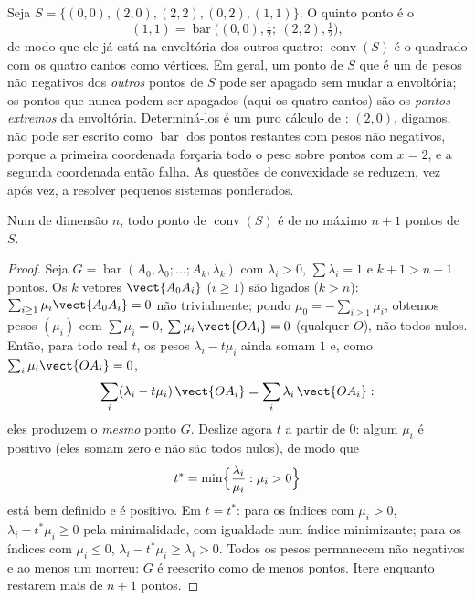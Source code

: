 \begin{example}\label{ex:b2:affine:squarehull}
Seja $S = \{(0,0), (2,0), (2,2), (0,2), (1,1)\}$. O quinto
ponto é o 
\[
(1,1) = \operatorname{bar}\bigl((0,0), \tfrac12;\ (2,2),
\tfrac12\bigr),
\]
de modo que ele já está na envoltória dos outros quatro:
$\operatorname{conv}(S)$ é o quadrado com os quatro cantos
como vértices. Em geral, um ponto de $S$ que é um
 de pesos não negativos dos \emph{outros} pontos de
$S$ pode ser apagado sem mudar a envoltória; os pontos que
nunca podem ser apagados (aqui os quatro cantos) são os
\emph{pontos extremos} da envoltória. Determiná-los é um puro
cálculo de : $(2,0)$, digamos, não pode ser escrito como
$\operatorname{bar}$ dos pontos restantes com pesos não
negativos, porque a primeira coordenada forçaria todo o peso
sobre pontos com $x = 2$, e a segunda coordenada então
falha. As questões de convexidade se reduzem, vez após vez, a
resolver pequenos sistemas ponderados.
\end{example}

\begin{theorem}[Carathéodory]\label{thm:b2:affine:caratheodory}
Num  de dimensão $n$, todo ponto de
$\operatorname{conv}(S)$ é  de no máximo $n + 1$ pontos
de $S$.
\end{theorem}

\begin{proof}
Seja $G = \operatorname{bar}(A_0, \lambda_0; \dots; A_k, \lambda_k)$
com $\lambda_i > 0$, $\sum\lambda_i = 1$ e $k + 1 > n + 1$
pontos. Os $k$ vetores $\vect{A_0A_i}$ ($i \geq 1$) são ligados
($k > n$): $\sum_{i\geq1}\mu_i \vect{A_0A_i} = 0$ não trivialmente;
pondo $\mu_0 = -\sum_{i\geq1}\mu_i$, obtemos pesos $(\mu_i)$
com $\sum\mu_i = 0$, $\sum \mu_i\,\vect{OA_i} = 0$ (qualquer $O$), não
todos nulos. Então, para todo real $t$, os pesos $\lambda_i - t\mu_i$
ainda somam $1$ e, como $\sum_i\mu_i\vect{OA_i} = 0$,
\[
\sum_i(\lambda_i - t\mu_i)\,\vect{OA_i}
= \sum_i\lambda_i\,\vect{OA_i} :
\]
eles produzem o \emph{mesmo} ponto $G$. Deslize agora $t$ a partir de
$0$: algum $\mu_i$ é positivo (eles somam zero e não são
todos nulos), de modo que
\[
t^* = \min\Bigl\{\frac{\lambda_i}{\mu_i} : \mu_i > 0\Bigr\}
\]
está bem definido e é positivo. Em $t = t^*$: para os índices com
$\mu_i > 0$, $\lambda_i - t^*\mu_i \geq 0$ pela minimalidade,
com igualdade num índice minimizante; para os índices com $\mu_i
\leq 0$, $\lambda_i - t^*\mu_i \geq \lambda_i > 0$. Todos os
pesos permanecem não negativos e ao menos um morreu: $G$ é
reescrito como  de menos pontos. Itere enquanto restarem mais
de $n + 1$ pontos.
\end{proof}

